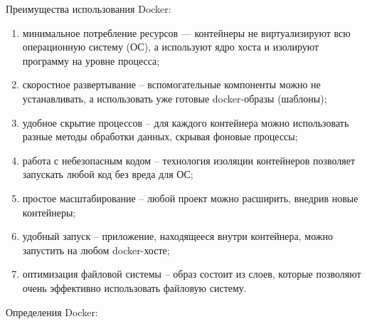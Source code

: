 Преимущества использования Docker:
\begin{enumerate}
	\item минимальное потребление ресурсов — контейнеры не виртуализируют всю операционную систему (ОС), а используют ядро хоста и изолируют программу на уровне процесса;
	\item скоростное развертывание -- вспомогательные компоненты можно не устанавливать, а использовать уже готовые docker-образы (шаблоны);
	\item удобное скрытие процессов -- для каждого контейнера можно использовать разные методы обработки данных, скрывая фоновые процессы;
	\item работа с небезопасным кодом -- технология изоляции контейнеров позволяет запускать любой код без вреда для ОС;
	\item простое масштабирование -- любой проект можно расширить, внедрив новые контейнеры;
	\item удобный запуск -- приложение, находящееся внутри контейнера, можно запустить на любом docker-хосте;
	\item оптимизация файловой системы -- образ состоит из слоев, которые позволяют очень эффективно использовать файловую систему.
\end{enumerate}
	Определения Docker:
